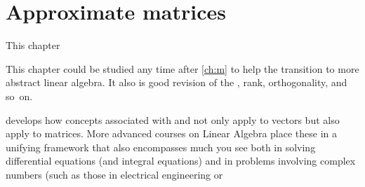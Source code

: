 
\chapter{Approximate matrices}
\label{ch:am}

\minitoc



This chapter 
\begin{aside}
This chapter could be studied any time after \cref{ch:m} to help the transition to more abstract linear algebra.  
It also is good revision of the \svd, rank, orthogonality, and so~on.
\end{aside}%
develops how concepts associated with  and  not only apply to vectors but also apply to matrices.  
More advanced courses on Linear Algebra place these in a unifying framework that also encompasses much you see both in solving differential equations (and integral equations) and in problems involving complex numbers (such as those in electrical engineering or 



\begin{comment} 
Huge applications of \svd{}s to video compression, experimental errors, and other areas.
Introduce digital \idx{image compression} by \svd{}s \pooliv{p.607--8} \holti{p.336--7}  \cite[\S07]{Davis99a}.
\cite{Higham86} mentions applications of \idx{polar decomposition} to the Orthogonal Procrustes problem.
\end{comment}







\endinput

